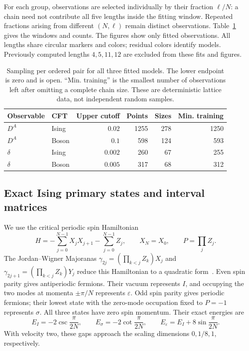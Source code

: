 For each group, observations are selected individually by their
fraction $\ell/N$: a chain need not contribute all five lengths
inside the fitting window. Repeated fractions arising from
different $(N,\ell)$ remain distinct observations.
Table~\ref{tab:num-windows} gives the windows and counts.
The figures show only fitted observations. All lengths share circular
markers and colors; residual colors identify models.
Previously computed lengths
$4,5,11,12$ are excluded from these fits and figures.
\begin{table}[htbp]\centering\small
\begin{tabular}{llrrrr}\toprule
Observable & CFT & Upper cutoff & Points & Sizes & Min. training\\\midrule
$D^A$ & Ising & $0.02$ & 1255 & 278 & 1250\\
$D^A$ & Boson & $0.1$ & 598 & 124 & 593\\
$\delta$ & Ising & $0.002$ & 260 & 67 & 255\\
$\delta$ & Boson & $0.005$ & 317 & 68 & 312\\\bottomrule
\end{tabular}
\caption{Sampling per ordered pair for all three fitted models.
The lower endpoint is zero and is open. ``Min. training'' is the
smallest number of observations left after omitting a complete
chain size. These are deterministic lattice data, not independent
random samples.}
\label{tab:num-windows}
\end{table}

\subsection{Exact Ising primary states and interval matrices}
\label{app:num-ising}
We use the critical periodic spin Hamiltonian
\begin{equation}
 H=-\sum_{j=0}^{N-1}X_jX_{j+1}-\sum_{j=0}^{N-1}Z_j,
 \qquad X_N=X_0,\qquad P=\prod_j Z_j.
 \label{eq:num-ising-H}
\end{equation}
The Jordan--Wigner Majoranas
$\gamma_{2j}=(\prod_{k<j}Z_k)X_j$ and
$\gamma_{2j+1}=(\prod_{k<j}Z_k)Y_j$ reduce this Hamiltonian
to a quadratic form~\cite{numMontes2017,numPeschelEisler}.
Even spin parity gives antiperiodic fermions. Their vacuum
represents $I$, and occupying the two modes at momenta
$\pm\pi/N$ represents $\varepsilon$. Odd spin parity gives
periodic fermions; their lowest state with the zero-mode
occupation fixed to $P=-1$ represents $\sigma$. All three
states have zero spin momentum. Their exact energies are
\begin{equation}
 E_I=-2\csc\frac{\pi}{2N},\qquad
 E_\sigma=-2\cot\frac{\pi}{2N},\qquad
 E_\varepsilon=E_I+8\sin\frac{\pi}{2N}.
 \label{eq:num-ising-energies}
\end{equation}
With velocity two, these gaps approach the scaling dimensions
$0,1/8,1$, respectively.

